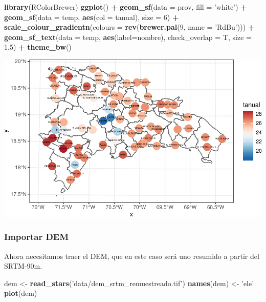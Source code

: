 \documentclass[11pt,]{article}
\newenvironment{Shaded}{\begin{snugshade}}{\end{snugshade}}
\newcommand{\KeywordTok}[1]{\textcolor[rgb]{0.13,0.29,0.53}{\textbf{#1}}}
\newcommand{\DataTypeTok}[1]{\textcolor[rgb]{0.13,0.29,0.53}{#1}}
\newcommand{\DecValTok}[1]{\textcolor[rgb]{0.00,0.00,0.81}{#1}}
\newcommand{\FloatTok}[1]{\textcolor[rgb]{0.00,0.00,0.81}{#1}}
\newcommand{\StringTok}[1]{\textcolor[rgb]{0.31,0.60,0.02}{#1}}
\newcommand{\OperatorTok}[1]{\textcolor[rgb]{0.81,0.36,0.00}{\textbf{#1}}}
\newcommand{\NormalTok}[1]{#1}
\begin{document}
\begin{Shaded}
\begin{Highlighting}[]
\KeywordTok{library}\NormalTok{(RColorBrewer)}
\KeywordTok{ggplot}\NormalTok{() }\OperatorTok{+}
\StringTok{  }\KeywordTok{geom_sf}\NormalTok{(}\DataTypeTok{data =}\NormalTok{ prov, }\DataTypeTok{fill =} \StringTok{'white'}\NormalTok{) }\OperatorTok{+}
\StringTok{  }\KeywordTok{geom_sf}\NormalTok{(}\DataTypeTok{data =}\NormalTok{ temp, }\KeywordTok{aes}\NormalTok{(}\DataTypeTok{col =}\NormalTok{ tanual), }\DataTypeTok{size =} \DecValTok{6}\NormalTok{) }\OperatorTok{+}\StringTok{ }
\StringTok{  }\KeywordTok{scale_colour_gradientn}\NormalTok{(}\DataTypeTok{colours =} \KeywordTok{rev}\NormalTok{(}\KeywordTok{brewer.pal}\NormalTok{(}\DecValTok{9}\NormalTok{, }\DataTypeTok{name =} \StringTok{'RdBu'}\NormalTok{))) }\OperatorTok{+}
\StringTok{  }\KeywordTok{geom_sf_text}\NormalTok{(}\DataTypeTok{data =}\NormalTok{ temp, }\KeywordTok{aes}\NormalTok{(}\DataTypeTok{label=}\NormalTok{nombre), }\DataTypeTok{check_overlap =}\NormalTok{ T, }\DataTypeTok{size =} \FloatTok{1.5}\NormalTok{) }\OperatorTok{+}
\StringTok{  }\KeywordTok{theme_bw}\NormalTok{()}
\end{Highlighting}
\end{Shaded}

\includegraphics{Proyecto-Precipitaciones_files/figure-latex/mapa-temp-1.pdf}

\subsubsection{Importar DEM}\label{importar-dem}

Ahora necesitamos traer el DEM, que en este caso será uno resumido a
partir del SRTM-90m.

\begin{Shaded}
\begin{Highlighting}[]
\NormalTok{dem <-}\StringTok{ }\KeywordTok{read_stars}\NormalTok{(}\StringTok{'data/dem_srtm_remuestreado.tif'}\NormalTok{)}
\KeywordTok{names}\NormalTok{(dem) <-}\StringTok{ 'ele'}
\KeywordTok{plot}\NormalTok{(dem)}
\end{Highlighting}
\end{Shaded}
\end{document}
